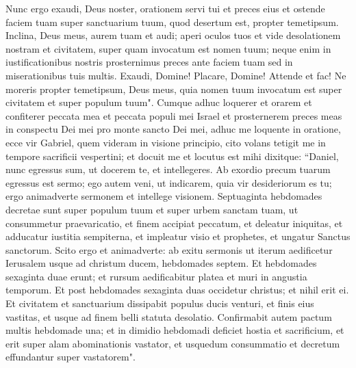 \begin{biblechapter}
\verse Nunc ergo exaudi, Deus noster, orationem servi tui et preces eius et ostende faciem tuam super sanctuarium tuum, quod desertum est, propter temetipsum.  
\verse Inclina, Deus meus, aurem tuam et audi; aperi oculos tuos et vide desolationem nostram et civitatem, super quam invocatum est nomen tuum; neque enim in iustificationibus nostris prosternimus preces ante faciem tuam sed in miserationibus tuis multis. 
\verse Exaudi, Domine! Placare, Domine! Attende et fac! Ne moreris propter temetipsum, Deus meus, quia nomen tuum invocatum est super civitatem et super populum tuum". 
\verse Cumque adhuc loquerer et orarem et confiterer peccata mea et peccata populi mei Israel et prosternerem preces meas in conspectu Dei mei pro monte sancto Dei mei, 
\verse adhuc me loquente in oratione, ecce vir Gabriel, quem videram in visione principio, cito volans tetigit me in tempore sacrificii vespertini;  
\verse et docuit me et locutus est mihi dixitque: “Daniel, nunc egressus sum, ut docerem te, et intellegeres. 
\verse Ab exordio precum tuarum egressus est sermo; ego autem veni, ut indicarem, quia vir desideriorum es tu; ergo animadverte sermonem et intellege visionem. 
\verse Septuaginta hebdomades decretae sunt super populum tuum et super urbem sanctam tuam, ut consummetur praevaricatio, et finem accipiat peccatum, et deleatur iniquitas, et adducatur iustitia sempiterna, et impleatur visio et prophetes, et ungatur Sanctus sanctorum. 
\verse Scito ergo et animadverte: ab exitu sermonis ut iterum aedificetur Ierusalem usque ad christum ducem, hebdomades septem. Et hebdomades sexaginta duae erunt; et rursum aedificabitur platea et muri in angustia temporum. 
\verse Et post hebdomades sexaginta duas occidetur christus; et nihil erit ei. Et civitatem et sanctuarium dissipabit populus ducis venturi, et finis eius vastitas, et usque ad finem belli statuta desolatio. 
\verse Confirmabit autem pactum multis hebdomade una; et in dimidio hebdomadi deficiet hostia et sacrificium, et erit super alam abominationis vastator, et usquedum consummatio et decretum effundantur super vastatorem". 
\end{biblechapter}

